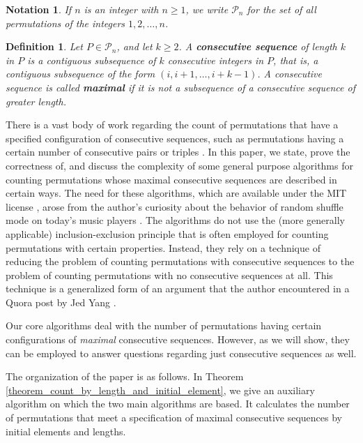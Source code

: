 \documentclass{article}
\newtheorem{definition}[theorem]{Definition}
\newtheorem{notation}[theorem]{Notation}
\begin{document}
\begin{notation}
  If $n$ is an integer with $n \geq 1$, we write ${\mathcal P}_n$ for the set of all permutations of the integers
  $1, 2, \ldots, n$.
\end{notation}

\begin{definition}
  Let $P\in {\mathcal P}_n$, and let $k \geq 2$.
  A {\bf consecutive sequence} of length $k$ in $P$ is a contiguous subsequence of $k$ consecutive
  integers in $P$, that is, a contiguous subsequence of the form $(i, i+1, \ldots, i+k-1)$.
  A consecutive sequence is called {\bf maximal} if it is not a subsequence of a consecutive sequence
  of greater length.
\end{definition}

There is a vast body of work regarding the count of permutations that have a specified configuration of
consecutive sequences, such as permutations having a certain number of consecutive pairs or triples
\cite{OeisRefs}. In this paper, we state, prove the correctness of, and discuss the complexity of some general
purpose algorithms for
counting permutations whose maximal consecutive sequences are described in certain ways. The need
for these algorithms, which are available under the MIT license \cite{Algos}, arose from the author's curiosity
about the behavior of random shuffle mode on today's music players \cite{BlogPost}. The algorithms do not
use the (more generally applicable) inclusion-exclusion principle that is often employed for counting
permutations with certain properties. Instead, they rely on a technique of reducing the problem of counting
permutations with consecutive sequences to the problem of counting permutations with no consecutive sequences
at all. This technique is a generalized form of an argument that the author encountered in a Quora post by Jed Yang
\cite{JedYang}.

Our core algorithms deal with the number of permutations having certain configurations of
     {\it maximal} consecutive sequences. However, as we will show, they can be employed to answer questions
     regarding just consecutive sequences as well.

The organization of the paper is as follows. In Theorem \ref{theorem_count_by_length_and_initial_element},
we give an auxiliary algorithm on which the
two main algorithms are based. It calculates the number of permutations that meet a specification of
maximal consecutive sequences by initial elements and lengths.
\end{document}
